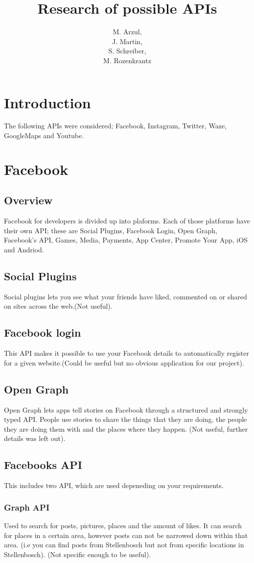 \documentclass{article}
\title{Research of possible APIs}
\author{M. Arzul, \\
J. Martin, \\
S. Schreiber, \\
M. Rozenkrantz}
\date{}
\begin{document}
\maketitle

\section{Introduction}
The following APIs were considered; Facebook, Instagram, Twitter, Waze, GoogleMaps and Youtube.

\section{Facebook}
\subsection{Overview}
Facebook for developers is divided up into plaforms. Each of those platforms have their own API; these are Social Plugins, Facebook Login, Open Graph, Facebook's API, Games, Media, Payments, App Center, Promote Your App, iOS and Andriod.
\subsection{Social Plugins}
Social plugins lets you see what your friends have liked, commented on or shared on sites across the web.(Not useful).
\subsection{Facebook login}
This API makes it possible to use your Facebook details to automatically register for
a given website.(Could be useful but no obvious application for our project).
\subsection{Open Graph}
Open Graph lets apps tell stories on Facebook through a structured and strongly typed API. People use stories to share the things that they are doing, the people they are doing them with and the places where they happen. (Not useful, further details was left out).
\subsection{Facebooks API}
This includes two API, which are used depeneding on your requirements.
\subsubsection{Graph API}
Used to search for posts, pictures, places and the amount of likes.
It can search for places in a certain area, however posts can not be narrowed down within that area. (i.e you can find posts from Stellenbosch but not from specific locations in Stellenbosch). (Not specific enough to be useful).
\end{document}
